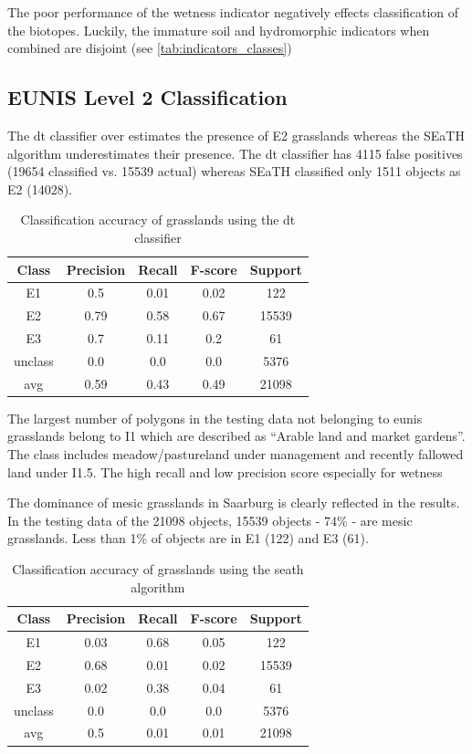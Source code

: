 \documentclass[authoryear,preprint,12pt,number]{elsarticle}
\begin{document}
The poor performance of the wetness indicator negatively effects classification 
of the
biotopes. Luckily, the immature soil and hydromorphic indicators when combined
are disjoint (see \ref{tab:indicators_classes})
\subsection{EUNIS Level 2 Classification}
\label{subsec:level2_classification}
The \gls{dt} classifier over estimates the presence of E2 grasslands whereas 
the SEaTH
algorithm underestimates their presence. The \gls{dt} classifier has 4115 false
positives (19654 classified vs. 15539 actual) whereas SEaTH classified only 1511
objects as E2 (14028). %
\begin{table}
\centering
\begin{tabular}{c c c c c}
Class & Precision & Recall & F-score & Support\\
\hline
E1 & 0.5 & 0.01 & 0.02 & 122\\
E2 & 0.79 & 0.58 & 0.67 & 15539\\
E3 & 0.7 & 0.11 & 0.2 & 61\\
unclass & 0.0 & 0.0 & 0.0 & 5376\\
avg & 0.59 & 0.43 & 0.49 & 21098\\
\end{tabular}
\caption{Classification accuracy of grasslands using the \gls{dt} 
classifier\label{fig:dt_lvl2_classification}}
\end{table}
The largest number of polygons in the testing data not belonging to \gls{eunis}
grasslands belong to I1 which are described as ``Arable land and
market gardens''. The class includes meadow/pastureland under management and
recently fallowed land under I1.5. The high recall and low precision score
especially for wetness 

The dominance of mesic grasslands in Saarburg is clearly reflected in
the results. In the testing data of the 21098 objects, 15539 objects - 74\% -
are mesic grasslands. Less than 1\% of objects are in E1 (122) and E3 (61). 
\begin{table}
\centering
\begin{tabular}{c c c c c}
Class & Precision & Recall & F-score & Support\\
\hline
E1 & 0.03 & 0.68 & 0.05 & 122\\
E2 & 0.68 & 0.01 & 0.02 & 15539\\
E3 & 0.02 & 0.38 & 0.04 & 61\\
unclass & 0.0 & 0.0 & 0.0 & 5376\\
avg & 0.5 & 0.01 & 0.01 & 21098\\
\end{tabular}
\caption{Classification accuracy of grasslands using the \gls{seath}
algorithm\label{fig:seath_lvl2_classification}}
\end{table}
\end{document}
